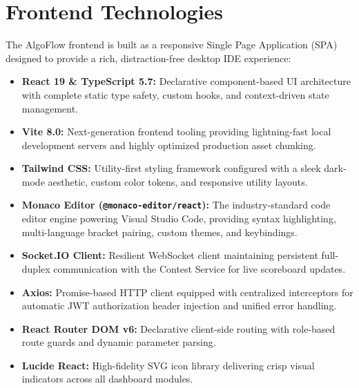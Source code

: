 \documentclass[12pt,a4paper]{report}
\begin{document}
\section{Frontend Technologies}
The AlgoFlow frontend is built as a responsive Single Page Application (SPA) designed to provide a rich, distraction-free desktop IDE experience:
\begin{itemize}[leftmargin=*]
  \item \textbf{React 19 \& TypeScript 5.7:} Declarative component-based UI architecture with complete static type safety, custom hooks, and context-driven state management.
  \item \textbf{Vite 8.0:} Next-generation frontend tooling providing lightning-fast local development servers and highly optimized production asset chunking.
  \item \textbf{Tailwind CSS:} Utility-first styling framework configured with a sleek dark-mode aesthetic, custom color tokens, and responsive utility layouts.
  \item \textbf{Monaco Editor (\texttt{@monaco-editor/react}):} The industry-standard code editor engine powering Visual Studio Code, providing syntax highlighting, multi-language bracket pairing, custom themes, and keybindings.
  \item \textbf{Socket.IO Client:} Resilient WebSocket client maintaining persistent full-duplex communication with the Contest Service for live scoreboard updates.
  \item \textbf{Axios:} Promise-based HTTP client equipped with centralized interceptors for automatic JWT authorization header injection and unified error handling.
  \item \textbf{React Router DOM v6:} Declarative client-side routing with role-based route guards and dynamic parameter parsing.
  \item \textbf{Lucide React:} High-fidelity SVG icon library delivering crisp visual indicators across all dashboard modules.
\end{itemize}
\end{document}
